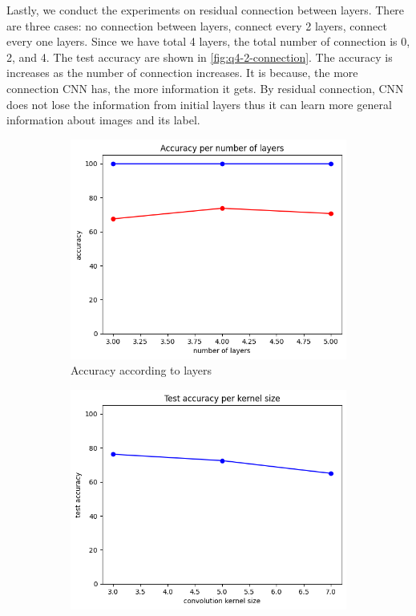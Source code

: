 Lastly, we conduct the experiments on residual connection between layers. There are three cases: no connection between layers, connect every 2 layers, connect every one layers. Since we have total 4 layers, the total number of connection is 0, 2, and 4. The test accuracy are shown in \cref{fig:q4-2-connection}. The accuracy is increases as the number of connection increases. It is because, the more connection CNN has, the more information it gets. By residual connection, CNN does not lose the information from initial layers thus it can learn more general information about images and its label.

\begin{figure}[htbp]
	\centering
	\begin{subfigure}[t]{0.3\linewidth}
		\centering
		\includegraphics[width=\linewidth]{image/q4-2-layers.png}
		\caption{Accuracy according to layers}
		\label{fig:q4-2-layers}
	\end{subfigure}	
    \hfill
	\begin{subfigure}[t]{0.3\linewidth}
		\centering
		\includegraphics[width=\linewidth]{image/q4-2-kernel.png}

\end{subfigure}
\end{figure}
